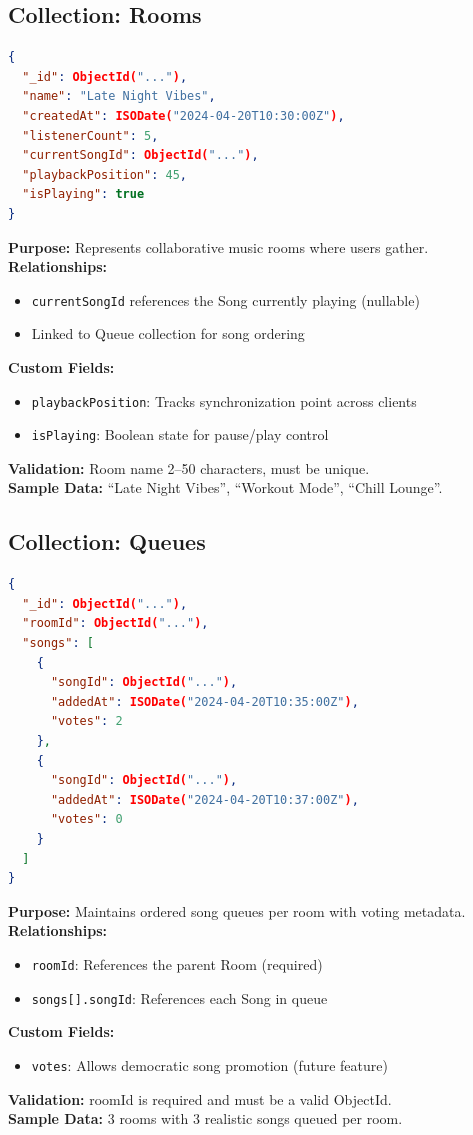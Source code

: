 \documentclass[11pt,a4paper]{article}
\begin{document}
\subsection{Collection: Rooms}

\begin{lstlisting}[language=json, caption=Room Document Structure]
{
  "_id": ObjectId("..."),
  "name": "Late Night Vibes",
  "createdAt": ISODate("2024-04-20T10:30:00Z"),
  "listenerCount": 5,
  "currentSongId": ObjectId("..."),
  "playbackPosition": 45,
  "isPlaying": true
}
\end{lstlisting}

\textbf{Purpose:} Represents collaborative music rooms where users gather. \\
\textbf{Relationships:}
\begin{itemize}
    \item \texttt{currentSongId} references the Song currently playing (nullable)
    \item Linked to Queue collection for song ordering
\end{itemize}
\textbf{Custom Fields:}
\begin{itemize}
    \item \texttt{playbackPosition}: Tracks synchronization point across clients
    \item \texttt{isPlaying}: Boolean state for pause/play control
\end{itemize}
\textbf{Validation:} Room name 2--50 characters, must be unique. \\
\textbf{Sample Data:} ``Late Night Vibes'', ``Workout Mode'', ``Chill Lounge''.

\subsection{Collection: Queues}

\begin{lstlisting}[language=json, caption=Queue Document Structure]
{
  "_id": ObjectId("..."),
  "roomId": ObjectId("..."),
  "songs": [
    {
      "songId": ObjectId("..."),
      "addedAt": ISODate("2024-04-20T10:35:00Z"),
      "votes": 2
    },
    {
      "songId": ObjectId("..."),
      "addedAt": ISODate("2024-04-20T10:37:00Z"),
      "votes": 0
    }
  ]
}
\end{lstlisting}

\textbf{Purpose:} Maintains ordered song queues per room with voting metadata. \\
\textbf{Relationships:}
\begin{itemize}
    \item \texttt{roomId}: References the parent Room (required)
    \item \texttt{songs[].songId}: References each Song in queue
\end{itemize}
\textbf{Custom Fields:}
\begin{itemize}
    \item \texttt{votes}: Allows democratic song promotion (future feature)
\end{itemize}
\textbf{Validation:} roomId is required and must be a valid ObjectId. \\
\textbf{Sample Data:} 3 rooms with 3 realistic songs queued per room.
\end{document}
